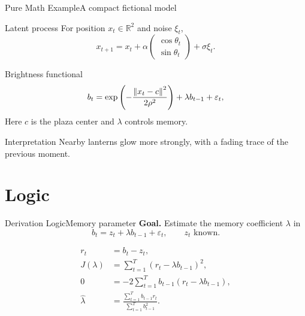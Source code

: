 \documentclass[aspectratio=169,professionalfonts]{beamer}
\begin{document}
\begin{frame}{Pure Math Example}{A compact fictional model}
  \small
  \begin{block}{Latent process}
    For position $x_t \in \mathbb{R}^2$ and noise $\xi_t$,
    \[
      x_{t+1}
      =
      x_t
      + \alpha
      \begin{pmatrix}
        \cos \theta_t \\
        \sin \theta_t
      \end{pmatrix}
      + \sigma \xi_t .
    \]
  \end{block}

  \begin{alertblock}{Brightness functional}
    \[
      b_t
      =
      \exp\left(-\frac{\norm{x_t-c}^2}{2\rho^2}\right)
      + \lambda b_{t-1}
      + \varepsilon_t,
    \]
    Here $c$ is the plaza center and $\lambda$ controls memory.
  \end{alertblock}

  \begin{exampleblock}{Interpretation}
    Nearby lanterns glow more strongly, with a fading trace of the previous moment.
  \end{exampleblock}
\end{frame}

\section{Logic}

\begin{frame}{Derivation Logic}{Memory parameter}
  \footnotesize
  \textbf{Goal.} Estimate the memory coefficient $\lambda$ in
  \[
    b_t = z_t + \lambda b_{t-1} + \varepsilon_t,
    \qquad z_t \text{ known}.
  \]

  \vspace{-0.25cm}
  \begin{align*}
    r_t &= b_t - z_t,\\
    J(\lambda) &= \sum_{t=1}^{T} (r_t-\lambda b_{t-1})^2,\\
    0 &= -2\sum_{t=1}^{T} b_{t-1}(r_t-\lambda b_{t-1}),\\
    \hat{\lambda}
    &= \frac{\sum_{t=1}^{T} b_{t-1}r_t}
            {\sum_{t=1}^{T} b_{t-1}^2}.
  \end{align*}
\end{frame}
\end{document}
